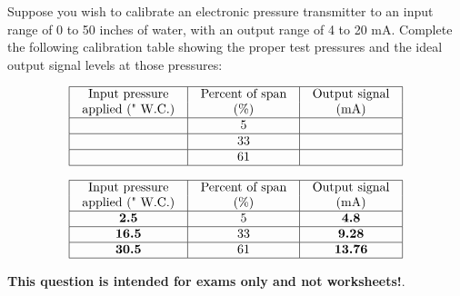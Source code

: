 

Suppose you wish to calibrate an electronic pressure transmitter to an input range of 0 to 50 inches of water, with an output range of 4 to 20 mA.  Complete the following calibration table showing the proper test pressures and the ideal output signal levels at those pressures:


$$\vbox{\offinterlineskip
\halign{\strut
\vrule \quad\hfil # \ \hfil & 
\vrule \quad\hfil # \ \hfil & 
\vrule \quad\hfil # \ \hfil \vrule \cr
\noalign{\hrule}
%
Input pressure & Percent of span & Output signal \cr
%
applied (" W.C.) & (\%) & (mA) \cr
%
\noalign{\hrule}
%
 & 5 &  \cr
%
\noalign{\hrule}
%
 & 33 &  \cr
%
\noalign{\hrule}
%
 & 61 &  \cr
%
\noalign{\hrule}
} %
}$$ %









$$\vbox{\offinterlineskip
\halign{\strut
\vrule \quad\hfil # \ \hfil & 
\vrule \quad\hfil # \ \hfil & 
\vrule \quad\hfil # \ \hfil \vrule \cr
\noalign{\hrule}
%
Input pressure & Percent of span & Output signal \cr
%
applied (" W.C.) & (\%) & (mA) \cr
%
\noalign{\hrule}
%
{\bf 2.5} & 5 & {\bf 4.8} \cr
%
\noalign{\hrule}
%
{\bf 16.5} & 33 & {\bf 9.28} \cr
%
\noalign{\hrule}
%
{\bf 30.5} & 61 & {\bf 13.76} \cr
%
\noalign{\hrule}
} %
}$$ %







{\bf This question is intended for exams only and not worksheets!}.




